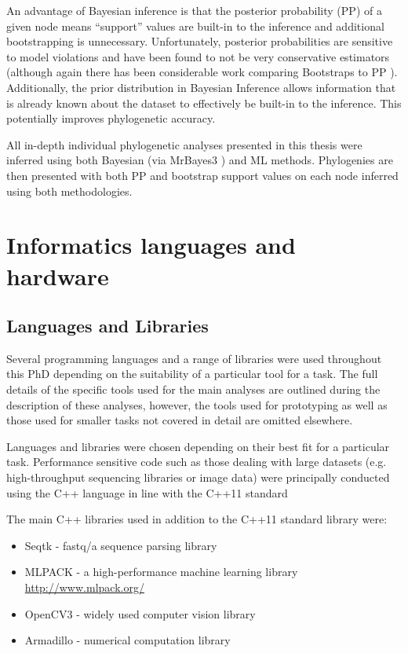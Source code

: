 An advantage of Bayesian inference is that the posterior probability (PP) of a given
node means ``support'' values are built-in to the inference and additional
bootstrapping is unnecessary.  Unfortunately, posterior probabilities are
sensitive to model violations and have been found to not be very conservative estimators
\citep{Simmons2003} (although again there has been considerable work comparing
Bootstraps to PP \citep{Anisimova2006}).
Additionally, the prior distribution in Bayesian Inference allows information
that is already known about the dataset to effectively be built-in to the inference.
This potentially improves phylogenetic accuracy.

All in-depth individual phylogenetic analyses presented in this thesis
were inferred using both Bayesian (via MrBayes3 \citep{Huelsenbeck2001,Ronquist2003a,Ronquist2012})
and ML methods.  Phylogenies are then presented with both PP and bootstrap
support values on each node inferred using both methodologies. 


\section{Informatics languages and hardware}

\subsection{Languages and Libraries} 

Several programming languages and a range of libraries were used throughout this PhD depending
on the suitability of a particular tool for a task.
The full details of the specific tools used for the main analyses are outlined during the description
of these analyses, however, the tools used for prototyping as well as those used for smaller tasks not covered
in detail are omitted elsewhere. 

Languages and libraries were chosen depending on their best fit for a particular task.
Performance sensitive code such as those dealing with large datasets (e.g. high-throughput sequencing 
libraries or image data) were principally conducted using the C++ language 
in line with the C++11 standard \citep{ISOInternationalStandard2011}

The main C++ libraries used in addition to the C++11 standard library were:
\begin{itemize}
    \item Seqtk - fastq/a sequence parsing library \citep{SeqtkGitHub}
    \item MLPACK - a high-performance machine learning library \url{http://www.mlpack.org/} \citep{mlpack2013}
    \item OpenCV3 - widely used computer vision library \citep{opencv_library}
    \item Armadillo - numerical computation library \citep{Sanderson2010}
\end{itemize}

